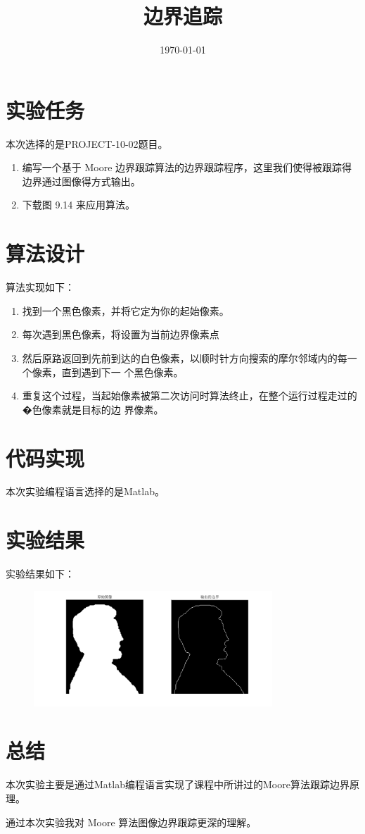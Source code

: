 \documentclass{../source/Experiment}
\title{边界追踪}
\date{\today}
\begin{document}
\makecover
\section{实验任务}

本次选择的是PROJECT-10-02题目。

\begin{enumerate}
    \item 编写一个基于 Moore 边界跟踪算法的边界跟踪程序，这里我们使得被跟踪得边界通过图像得方式输出。
    \item 下载图 9.14 来应用算法。
\end{enumerate}

\section{算法设计}
算法实现如下：

\begin{enumerate}
    \item 找到一个黑色像素，并将它定为你的起始像素。
    \item 每次遇到黑色像素，将设置为当前边界像素点
    \item 然后原路返回到先前到达的白色像素，以顺时针方向搜索的摩尔邻域内的每一个像素，直到遇到下一
          个黑色像素。
    \item 重复这个过程，当起始像素被第二次访问时算法终止，在整个运行过程走过的�色像素就是目标的边
          界像素。
\end{enumerate}


\section{代码实现}
本次实验编程语言选择的是Matlab。



\section{实验结果}
实验结果如下：

\begin{figure}[H]
    \centering
    \includegraphics[width = 0.8\textwidth]{第六次/untitled.png}
\end{figure}


\section{总结}
本次实验主要是通过Matlab编程语言实现了课程中所讲过的Moore算法跟踪边界原理。

通过本次实验我对 Moore 算法图像边界跟踪更深的理解。
\end{document}
